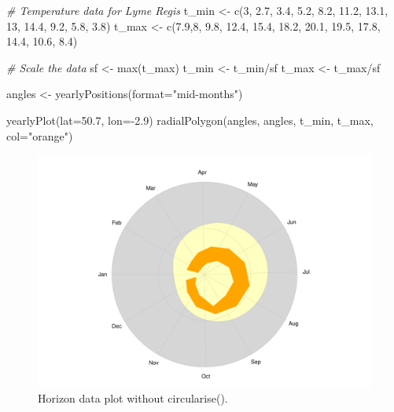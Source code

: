 \documentclass[
]{book}
\newenvironment{Shaded}{\begin{snugshade}}{\end{snugshade}}
\newcommand{\AttributeTok}[1]{\textcolor[rgb]{0.77,0.63,0.00}{#1}}
\newcommand{\CommentTok}[1]{\textcolor[rgb]{0.56,0.35,0.01}{\textit{#1}}}
\newcommand{\DecValTok}[1]{\textcolor[rgb]{0.00,0.00,0.81}{#1}}
\newcommand{\FloatTok}[1]{\textcolor[rgb]{0.00,0.00,0.81}{#1}}
\newcommand{\FunctionTok}[1]{\textcolor[rgb]{0.00,0.00,0.00}{#1}}
\newcommand{\NormalTok}[1]{#1}
\newcommand{\OtherTok}[1]{\textcolor[rgb]{0.56,0.35,0.01}{#1}}
\newcommand{\SpecialCharTok}[1]{\textcolor[rgb]{0.00,0.00,0.00}{#1}}
\newcommand{\StringTok}[1]{\textcolor[rgb]{0.31,0.60,0.02}{#1}}
\begin{document}
\begin{Shaded}
\begin{Highlighting}[]
\CommentTok{\# Temperature data for Lyme Regis}
\NormalTok{t\_min }\OtherTok{\textless{}{-}} \FunctionTok{c}\NormalTok{(}\DecValTok{3}\NormalTok{, }\FloatTok{2.7}\NormalTok{, }\FloatTok{3.4}\NormalTok{, }\FloatTok{5.2}\NormalTok{, }\FloatTok{8.2}\NormalTok{, }\FloatTok{11.2}\NormalTok{, }\FloatTok{13.1}\NormalTok{, }\DecValTok{13}\NormalTok{, }\FloatTok{14.4}\NormalTok{, }\FloatTok{9.2}\NormalTok{, }\FloatTok{5.8}\NormalTok{, }\FloatTok{3.8}\NormalTok{)}
\NormalTok{t\_max }\OtherTok{\textless{}{-}} \FunctionTok{c}\NormalTok{(}\FloatTok{7.9}\NormalTok{,}\DecValTok{8}\NormalTok{, }\FloatTok{9.8}\NormalTok{, }\FloatTok{12.4}\NormalTok{, }\FloatTok{15.4}\NormalTok{, }\FloatTok{18.2}\NormalTok{, }\FloatTok{20.1}\NormalTok{, }\FloatTok{19.5}\NormalTok{, }\FloatTok{17.8}\NormalTok{, }\FloatTok{14.4}\NormalTok{, }\FloatTok{10.6}\NormalTok{, }\FloatTok{8.4}\NormalTok{)}

\CommentTok{\# Scale the data}
\NormalTok{sf }\OtherTok{\textless{}{-}} \FunctionTok{max}\NormalTok{(t\_max)}
\NormalTok{t\_min }\OtherTok{\textless{}{-}}\NormalTok{ t\_min}\SpecialCharTok{/}\NormalTok{sf}
\NormalTok{t\_max }\OtherTok{\textless{}{-}}\NormalTok{ t\_max}\SpecialCharTok{/}\NormalTok{sf}

\NormalTok{angles }\OtherTok{\textless{}{-}} \FunctionTok{yearlyPositions}\NormalTok{(}\AttributeTok{format=}\StringTok{"mid{-}months"}\NormalTok{)}

\FunctionTok{yearlyPlot}\NormalTok{(}\AttributeTok{lat=}\FloatTok{50.7}\NormalTok{, }\AttributeTok{lon=}\SpecialCharTok{{-}}\FloatTok{2.9}\NormalTok{)}
\FunctionTok{radialPolygon}\NormalTok{(angles, angles, t\_min, t\_max, }\AttributeTok{col=}\StringTok{"orange"}\NormalTok{)}
\end{Highlighting}
\end{Shaded}

\begin{figure}

{\centering \includegraphics[width=0.9\linewidth]{_main_files/figure-latex/lyme-temp-1-1} 

}

\caption{Horizon data plot without circularise().}\label{fig:lyme-temp-1}
\end{figure}
\end{document}
